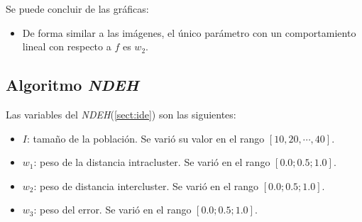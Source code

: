 \begin{figure}[H]
  \centering
  \label{fig:f_wpso_csv4}
\end{figure}

	Se puede concluir de las gráficas:
\begin{itemize}
	\item De forma similar a las imágenes, el único parámetro con
un comportamiento lineal con respecto a $f$ es $w_2$.
\end{itemize}

\subsection{Algoritmo \emph{NDEH}}\label{sect:inde-rv}

    Las variables del \emph{NDEH}(\ref{sect:ide}) son las siguientes:
\begin{itemize}
    \item $I$: tamaño de la población. Se varió su valor en el rango
$[10, 20, \cdots, 40]$.
    \item $w_1$: peso de la distancia intracluster. Se varió en el rango
$[0.0; 0.5; 1.0]$.
    \item $w_2$: peso de distancia intercluster. Se varió en el rango
$[0.0; 0.5; 1.0]$.
    \item $w_3$: peso del error. Se varió en el rango
$[0.0; 0.5; 1.0]$.
\end{itemize}

